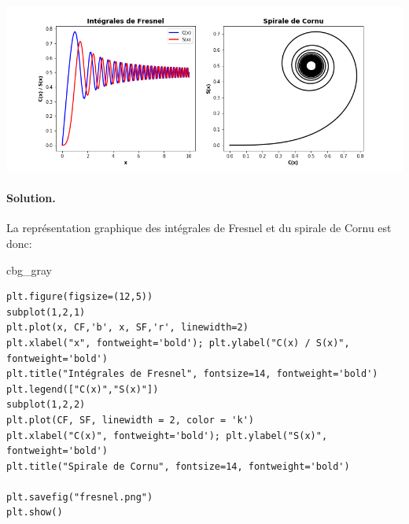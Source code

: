 \documentclass[%
oneside,                 %
final,                   %
10pt,french]{article}
\newenvironment{_cod_tight}[1]{
   \def\FrameCommand{\colorbox{#1}}
   \FrameRule0.6pt\MakeFramed {\FrameRestore}\vskip3mm}
   {\vskip0mm\endMakeFramed}
\newenvironment{cod}[1]{
\bgroup\rmfamily
\fboxsep=0mm\relax
\begin{_cod_tight}{#1}
\list{}{\parsep=-2mm\parskip=0mm\topsep=0pt\leftmargin=2mm
\rightmargin=2\leftmargin\leftmargin=4pt\relax}
\item\relax}
{\endlist\end{_cod_tight}\egroup}
\newenvironment{doconceexercise}{}{}
\begin{document}
\begin{doconceexercise}
\centerline{\includegraphics[width=0.7\linewidth]{figs/fresnel.png}}

\vspace{6mm}




\paragraph{Solution.}
La représentation graphique des intégrales de Fresnel et du spirale de Cornu est donc:
\begin{cod}{cbg_gray}\begin{verbatim}
plt.figure(figsize=(12,5))
subplot(1,2,1)
plt.plot(x, CF,'b', x, SF,'r', linewidth=2)
plt.xlabel("x", fontweight='bold'); plt.ylabel("C(x) / S(x)", fontweight='bold')
plt.title("Intégrales de Fresnel", fontsize=14, fontweight='bold')
plt.legend(["C(x)","S(x)"])
subplot(1,2,2)
plt.plot(CF, SF, linewidth = 2, color = 'k')
plt.xlabel("C(x)", fontweight='bold'); plt.ylabel("S(x)", fontweight='bold')
plt.title("Spirale de Cornu", fontsize=14, fontweight='bold')

plt.savefig("fresnel.png")
plt.show()
\end{verbatim}
\end{cod}
\noindent


\end{doconceexercise}



\end{document}
